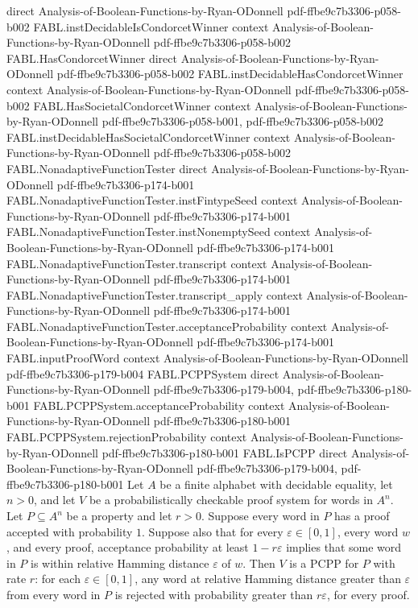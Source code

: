 \begin{theorem}
  {direct}
  {Analysis-of-Boolean-Functions-by-Ryan-ODonnell}
  {pdf-ffbe9c7b3306-p058-b002}
\proofstep
  {FABL.instDecidableIsCondorcetWinner}
  {context}
  {Analysis-of-Boolean-Functions-by-Ryan-ODonnell}
  {pdf-ffbe9c7b3306-p058-b002}
\proofstep
  {FABL.HasCondorcetWinner}
  {direct}
  {Analysis-of-Boolean-Functions-by-Ryan-ODonnell}
  {pdf-ffbe9c7b3306-p058-b002}
\proofstep
  {FABL.instDecidableHasCondorcetWinner}
  {context}
  {Analysis-of-Boolean-Functions-by-Ryan-ODonnell}
  {pdf-ffbe9c7b3306-p058-b002}
\proofstep
  {FABL.HasSocietalCondorcetWinner}
  {context}
  {Analysis-of-Boolean-Functions-by-Ryan-ODonnell}
  {pdf-ffbe9c7b3306-p058-b001,
    pdf-ffbe9c7b3306-p058-b002}
\proofstep
  {FABL.instDecidableHasSocietalCondorcetWinner}
  {context}
  {Analysis-of-Boolean-Functions-by-Ryan-ODonnell}
  {pdf-ffbe9c7b3306-p058-b002}
\proofstep
  {FABL.NonadaptiveFunctionTester}
  {direct}
  {Analysis-of-Boolean-Functions-by-Ryan-ODonnell}
  {pdf-ffbe9c7b3306-p174-b001}
\proofstep
  {FABL.NonadaptiveFunctionTester.instFintypeSeed}
  {context}
  {Analysis-of-Boolean-Functions-by-Ryan-ODonnell}
  {pdf-ffbe9c7b3306-p174-b001}
\proofstep
  {FABL.NonadaptiveFunctionTester.instNonemptySeed}
  {context}
  {Analysis-of-Boolean-Functions-by-Ryan-ODonnell}
  {pdf-ffbe9c7b3306-p174-b001}
\proofstep
  {FABL.NonadaptiveFunctionTester.transcript}
  {context}
  {Analysis-of-Boolean-Functions-by-Ryan-ODonnell}
  {pdf-ffbe9c7b3306-p174-b001}
\proofstep
  {FABL.NonadaptiveFunctionTester.transcript_apply}
  {context}
  {Analysis-of-Boolean-Functions-by-Ryan-ODonnell}
  {pdf-ffbe9c7b3306-p174-b001}
\proofstep
  {FABL.NonadaptiveFunctionTester.acceptanceProbability}
  {context}
  {Analysis-of-Boolean-Functions-by-Ryan-ODonnell}
  {pdf-ffbe9c7b3306-p174-b001}
\proofstep
  {FABL.inputProofWord}
  {context}
  {Analysis-of-Boolean-Functions-by-Ryan-ODonnell}
  {pdf-ffbe9c7b3306-p179-b004}
\proofstep
  {FABL.PCPPSystem}
  {direct}
  {Analysis-of-Boolean-Functions-by-Ryan-ODonnell}
  {pdf-ffbe9c7b3306-p179-b004,
    pdf-ffbe9c7b3306-p180-b001}
\proofstep
  {FABL.PCPPSystem.acceptanceProbability}
  {context}
  {Analysis-of-Boolean-Functions-by-Ryan-ODonnell}
  {pdf-ffbe9c7b3306-p180-b001}
\proofstep
  {FABL.PCPPSystem.rejectionProbability}
  {context}
  {Analysis-of-Boolean-Functions-by-Ryan-ODonnell}
  {pdf-ffbe9c7b3306-p180-b001}
\proofstep
  {FABL.IsPCPP}
  {direct}
  {Analysis-of-Boolean-Functions-by-Ryan-ODonnell}
  {pdf-ffbe9c7b3306-p179-b004,
    pdf-ffbe9c7b3306-p180-b001}
Let $A$ be a finite alphabet with decidable equality, let $n>0$, and let $V$ be a
probabilistically checkable proof system for words in $A^n$. Let $P\subseteq A^n$ be a
property and let $r>0$. Suppose every word in $P$ has a proof accepted with probability
$1$. Suppose also that for every $\varepsilon\in[0,1]$, every word $w$, and every proof,
acceptance probability at least $1-r\varepsilon$ implies that some word in $P$ is within
relative Hamming distance $\varepsilon$ of $w$. Then $V$ is a PCPP for $P$ with rate
$r$: for each $\varepsilon\in[0,1]$, any word at relative Hamming distance greater than
$\varepsilon$ from every word in $P$ is rejected with probability greater than
$r\varepsilon$, for every proof.
\end{theorem}

